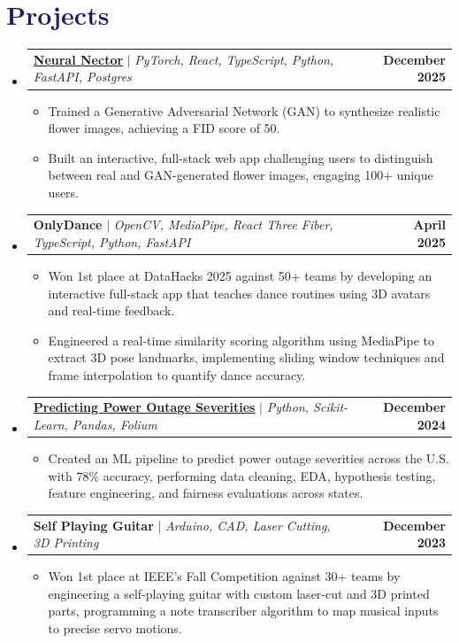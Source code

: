 \documentclass[letterpaper,11pt]{article}
\makeatletter
\newcommand{\resumeItem}[1]{
  \item\small{
    {#1 \vspace{-2pt}}
  }
}
\newcommand{\resumeProjectHeading}[2]{
    \item
    \begin{tabular*}{1.001\textwidth}{l@{\extracolsep{\fill}}r}
      \small#1 & \textbf{\small #2}\\
    \end{tabular*}\vspace{-7pt}
}
\newcommand{\resumeSubHeadingListStart}{\begin{itemize}[leftmargin=0.0in, label={}]}
\newcommand{\resumeSubHeadingListEnd}{\end{itemize}}
\newcommand{\resumeItemListStart}{\begin{itemize}}
\newcommand{\resumeItemListEnd}{\end{itemize}\vspace{-5pt}}
\newcommand\accentColor{MidnightBlue}
\makeatother
\begin{document}
\section{\textcolor{\accentColor}{Projects}}
\vspace{-7pt}
\resumeSubHeadingListStart
    \resumeProjectHeading
        {\textbf{\href{https://neuralnector.issacroy.com}{\underline{Neural Nector}}} $|$ \emph{PyTorch, React, TypeScript, Python, FastAPI, Postgres}}{December 2025}
        \resumeItemListStart
            \resumeItem{Trained a Generative Adversarial Network (GAN) to synthesize realistic flower images, achieving a FID score of 50.}
            \resumeItem{Built an interactive, full-stack web app challenging users to distinguish between real and GAN-generated flower images, engaging 100+ unique users.}
        \resumeItemListEnd
    \vspace{-15pt}
    \resumeProjectHeading
        {\textbf{OnlyDance} $|$ \emph{OpenCV, MediaPipe, React Three Fiber, TypeScript, Python, FastAPI}}{April 2025}
        \resumeItemListStart
            \resumeItem{Won 1st place at DataHacks 2025 against 50+ teams by developing an interactive full-stack app that teaches dance routines using 3D avatars and real-time feedback.}
            \resumeItem{Engineered a real-time similarity scoring algorithm using MediaPipe to extract 3D pose landmarks, implementing sliding window techniques and frame interpolation to quantify dance accuracy.}
        \resumeItemListEnd
        \vspace{-15pt}
    \resumeProjectHeading
        {\textbf{\href{https://theboyroy05.github.io/Power-Outages/}{\underline{Predicting Power Outage Severities}}} $|$ \emph{Python, Scikit-Learn, Pandas, Folium}}{December 2024}
        \resumeItemListStart
            \resumeItem{Created an ML pipeline to predict power outage severities across the U.S. with 78\% accuracy, performing data cleaning, EDA, hypothesis testing, feature engineering, and fairness evaluations across states.}
        \resumeItemListEnd
    \vspace{-15pt}
    \resumeProjectHeading
        {\textbf{Self Playing Guitar} $|$ \emph{Arduino, CAD, Laser Cutting, 3D Printing}}{December 2023}
        \resumeItemListStart
            \resumeItem{Won 1st place at IEEE's Fall Competition against 30+ teams by engineering a self-playing guitar with custom laser-cut and 3D printed parts, programming a note transcriber algorithm to map musical inputs to precise servo motions.}
        \resumeItemListEnd
    \resumeSubHeadingListEnd
\vspace{-15pt}
\end{document}
